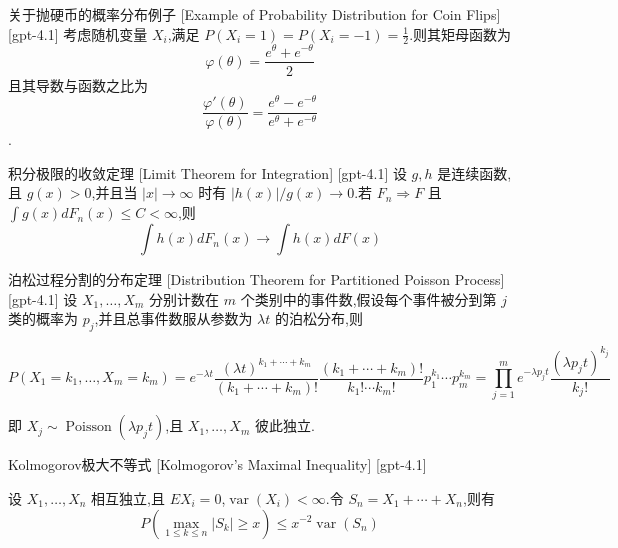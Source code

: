 \documentclass[UTF8]{ctexart}
\begin{document}
    
    
    \begin{xmp}
        {关于抛硬币的概率分布例子}
        [Example of Probability Distribution for Coin Flips]
        [gpt-4.1]
        考虑随机变量 $X_i$,满足 $P(X_i = 1) = P(X_i = -1) = \frac{1}{2}$.则其矩母函数为
\[
\varphi(\theta) = \frac{e^\theta + e^{-\theta}}{2}
\]
且其导数与函数之比为
\[
\frac{\varphi'(\theta)}{\varphi(\theta)} = \frac{e^\theta - e^{-\theta}}{e^\theta + e^{-\theta}}
\]
.
    \end{xmp}
    
    
    
    \begin{thm}
        {积分极限的收敛定理}
        [Limit Theorem for Integration]
        [gpt-4.1]
        设 $g, h$ 是连续函数,且 $g(x) > 0$,并且当 $|x| \to \infty$ 时有 $|h(x)|/g(x) \to 0$.若 $F_n \Rightarrow F$ 且 $\int g(x) dF_n(x) \leq C < \infty$,则
\[
\int h(x) dF_n(x) \to \int h(x) dF(x)
\]

    \end{thm}
    
    
    
    \begin{thm}
        {泊松过程分割的分布定理}
        [Distribution Theorem for Partitioned Poisson Process]
        [gpt-4.1]
        设 $X_1, \dots, X_m$ 分别计数在 $m$ 个类别中的事件数,假设每个事件被分到第 $j$ 类的概率为 $p_j$,并且总事件数服从参数为 $\lambda t$ 的泊松分布,则

\[
P(X_{1}=k_{1}, \dots, X_{m}=k_{m})
= e^{-\lambda t} \frac{(\lambda t)^{k_{1} + \cdots + k_{m}}}{(k_{1} + \cdots + k_{m})!} \frac{(k_{1} + \cdots + k_{m})!}{k_{1}! \cdots k_{m}!} p_{1}^{k_{1}} \cdots p_{m}^{k_{m}}
= \prod_{j=1}^{m} e^{-\lambda p_{j} t} \frac{(\lambda p_{j} t)^{k_{j}}}{k_{j}!}
\]

即 $X_j \sim \operatorname{Poisson}(\lambda p_j t)$,且 $X_1, \dots, X_m$ 彼此独立.

    \end{thm}
    
    
    
    \begin{thm}
        {Kolmogorov极大不等式}
        [Kolmogorov's Maximal Inequality]
        [gpt-4.1]
        
设 $X_{1}, \ldots, X_{n}$ 相互独立,且 $E X_{i} = 0$,$\operatorname{var}(X_{i}) < \infty$.令 $S_{n} = X_{1} + \cdots + X_{n}$,则有
\[
P\left(\max_{1 \leq k \leq n} |S_{k}| \geq x\right) \leq x^{-2} \operatorname{var}\left(S_{n}\right)
\]

    \end{thm}
    
\end{document}
